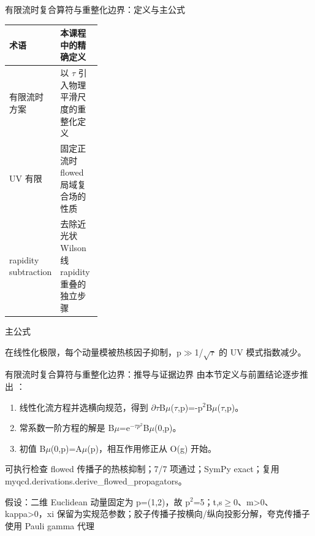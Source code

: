 \begin{frame}[t]{有限流时复合算符与重整化边界：定义与主公式}
\footnotesize\begin{tabularx}{\linewidth}{p{0.30\linewidth}Y}
\toprule 术语 & 本课程中的精确定义\\\midrule
{} 有限流时方案 & 以 \ensuremath{\tau} 引入物理平滑尺度的重整化定义\\
 UV 有限 & 固定正流时 flowed 局域复合场的性质\\
 rapidity subtraction & 去除近光状 Wilson 线 rapidity 重叠的独立步骤\\
\bottomrule\end{tabularx}\vspace{0.15cm}
\begin{block}{ 主公式}\centering{}\end{block}
在线性化极限，每个动量模被热核因子抑制，p\ensuremath{\gg}1/\allowbreak{}\ensuremath{\sqrt{\tau}} 的 UV 模式指数减少。
\end{frame}

\begin{frame}[t]{有限流时复合算符与重整化边界：推导与证据边界}
\footnotesize
{}\quad 由本节定义与前置结论逐步推出 ：
\begin{enumerate}
\item 线性化流方程并选横向规范，得到 \ensuremath{\partial}\ensuremath{\tau}B\ensuremath{\mu}(\ensuremath{\tau},p)=-p\ensuremath{^{2}}B\ensuremath{\mu}(\ensuremath{\tau},p)。
\item 常系数一阶方程的解是 B\ensuremath{\mu}=e\ensuremath{^{-\tau{}p^{2}}}B\ensuremath{\mu}(0,p)。
\item 初值 B\ensuremath{\mu}(0,p)=A\ensuremath{\mu}(p)，相互作用修正从 O(g) 开始。
\end{enumerate}\begin{block}{可执行检查}
\quad flowed 传播子的热核抑制；7/7 项通过；SymPy exact；复用 myqcd.derivations.derive\_flowed\_propagators。
\par\scriptsize 假设：二维 Euclidean 动量固定为 p=(1,2)，故 p\ensuremath{^{2}}=5；t,s\ensuremath{\ge}0、m>0、kappa>0，xi 保留为实规范参数；胶子传播子按横向/\allowbreak{}纵向投影分解，夸克传播子使用 Pauli gamma 代理
\end{block}
\end{frame}

